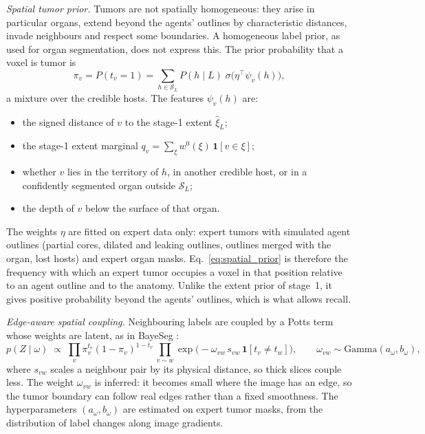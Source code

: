 \documentclass[fleqn,10pt]{olplainarticle}
\begin{document}
\emph{Spatial tumor prior.} Tumors are not spatially homogeneous: they arise in particular organs, extend beyond the agents'
outlines by characteristic distances, invade neighbours and respect some boundaries. A homogeneous label prior, as used
for organ segmentation, does not express this. The prior probability that a voxel is tumor is
\begin{equation}
\label{eq:spatial_prior}
\pi_v=P(t_v=1)=\sum_{h\in\mathcal{S}_L}P(h\mid L)\;\sigma\bigl(\eta^\top\psi_v(h)\bigr),
\end{equation}
a mixture over the credible hosts. The features $\psi_v(h)$ are:
\begin{itemize}
\item the signed distance of $v$ to the stage-1 extent $\hat\xi_L$;
\item the stage-1 extent marginal $q_v=\sum_{\xi}w^0(\xi)\,\mathbf{1}[v\in\xi]$;
\item whether $v$ lies in the territory of $h$, in another credible host, or in a confidently segmented organ outside
$\mathcal{S}_L$;
\item the depth of $v$ below the surface of that organ.
\end{itemize}
The weights $\eta$ are fitted on expert data only: expert tumors with simulated agent outlines (partial cores, dilated and
leaking outlines, outlines merged with the organ, lost hosts) and expert organ masks. Eq.~\eqref{eq:spatial_prior} is
therefore the frequency with which an expert tumor occupies a voxel in that position relative to an agent outline and to
the anatomy. Unlike the extent prior of stage~1, it gives positive probability beyond the agents' outlines, which is what
allows recall.

\emph{Edge-aware spatial coupling.} Neighbouring labels are coupled by a Potts term whose weights are latent, as in
BayeSeg \cite{gao2023bayeseg}:
\begin{equation}
\label{eq:mrf}
p(Z\mid\omega)\;\propto\;\prod_{v}\pi_v^{t_v}(1-\pi_v)^{1-t_v}\,\prod_{v\sim w}\exp\bigl(-\omega_{vw}\,s_{vw}\,
\mathbf{1}[t_v\ne t_w]\bigr),\qquad \omega_{vw}\sim\mathrm{Gamma}(a_\omega,b_\omega),
\end{equation}
where $s_{vw}$ scales a neighbour pair by its physical distance, so thick slices couple less. The weight $\omega_{vw}$ is
inferred: it becomes small where the image has an edge, so the tumor boundary can follow real edges rather than a fixed
smoothness. The hyperparameters $(a_\omega,b_\omega)$ are estimated on expert tumor masks, from the distribution of label
changes along image gradients.
\end{document}
